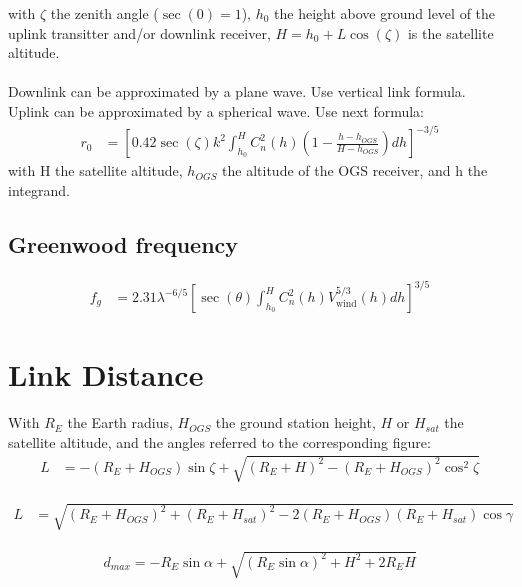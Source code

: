 \documentclass[a4paper]{article}
\begin{document}
with $\zeta$ the zenith angle ($\sec(0)=1$), $h_0$ the height above ground level of the uplink transitter and/or downlink receiver, $H=h_0+L\cos(\zeta)$ is the satellite altitude. \\
\\
Downlink can be approximated by a plane wave. Use vertical link formula.\\
Uplink can be approximated by a spherical wave. Use next formula:\\

\begin{align*}
r_0 &= \left[0.42\sec(\zeta)k^2\int_{h_0}^H C_n^2(h)\left(1-\frac{h-h_{OGS}}{H-h_{OGS}}\right)
dh\right]^{-3/5}
\end{align*}
with H the satellite altitude, $h_{OGS}$ the altitude of the OGS receiver, and h the integrand.


\subsection{Greenwood frequency}
\begin{align*}
f_g &= 2.31\lambda^{-6/5}\left[\sec(\theta)\int_{h_0}^H C_n^2(h)V_{\textrm{wind}}^{5/3}(h)dh\right]^{3/5}
\end{align*}



\section{Link Distance}
With $R_E$ the Earth radius, $H_{OGS}$ the ground station height, $H$ or $H_{sat}$ the satellite altitude, and the angles referred to the corresponding figure:
\begin{align*}
L &= -(R_E + H_{OGS})\sin\zeta+\sqrt{(R_E + H)^2 - (R_E + H_{OGS})^2\cos^2\zeta}
\end{align*}

\begin{align*}
L &= \sqrt{ (R_E+H_{OGS})^2 + (R_E + H_{sat})^2 - 2(R_E + H_{OGS})(R_E + H_{sat})\cos \gamma}
\end{align*}

\begin{align*}
d_{max} = -R_E\sin \alpha+\sqrt{(R_E\sin\alpha)^2+H^2+2R_E H}
\end{align*}
\end{document}
